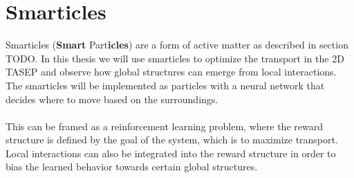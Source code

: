 \section{Smarticles}
\label{sec:smarticles}
Smarticles (\textbf{Smart} Part\textbf{icles}) are a form of active matter as described in section TODO. In this thesis we will use smarticles to optimize the transport in the 2D TASEP and observe how global structures can emerge from local interactions. The smarticles will be implemented as particles with a neural network that decides where to move based on the surroundings. 
\\
\\
This can be framed as a reinforcement learning problem, where the reward structure is defined by the goal of the system, which is to maximize transport. Local interactions can also be integrated into the reward structure in order to bias the learned behavior towards certain global structures.  